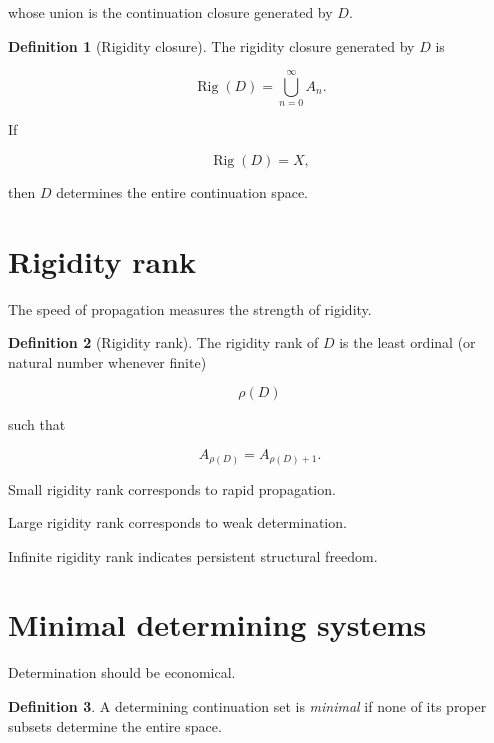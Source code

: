 \documentclass[13pt,openany]{book}
\theoremstyle{plain}
\theoremstyle{definition}
\newtheorem{definition}{Definition}[chapter]
\begin{document}
whose union is the continuation closure generated by $D$.


\begin{definition}[Rigidity closure]
The rigidity closure generated by $D$ is

\[
\operatorname{Rig}(D)
=
\bigcup_{n=0}^{\infty}A_n.
\]

\end{definition}

If

\[
\operatorname{Rig}(D)=X,
\]

then $D$ determines the entire continuation space.


\section{Rigidity rank}

The speed of propagation measures the strength of rigidity.

\begin{definition}[Rigidity rank]

The rigidity rank of $D$ is the least ordinal (or natural number whenever finite)

\[
\rho(D)
\]

such that

\[
A_{\rho(D)}
=
A_{\rho(D)+1}.
\]

\end{definition}

Small rigidity rank corresponds to rapid propagation.

Large rigidity rank corresponds to weak determination.

Infinite rigidity rank indicates persistent structural freedom.


\section{Minimal determining systems}

Determination should be economical.

\begin{definition}

A determining continuation set is
\emph{minimal}
if none of its proper subsets determine the entire space.

\end{definition}
\end{document}
